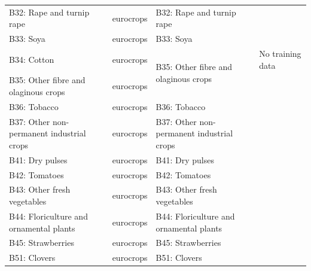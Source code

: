 \begin{table}[]
{\begin{tabular}{llll}
B32: Rape and turnip rape                     & eurocrops               & B32: Rape and turnip rape                             &                                                           \\
B33: Soya                                     & eurocrops               & B33: Soya                                             &                                                           \\
B34: Cotton                                   & eurocrops               & \multirow{2}{*}{B35: Other fibre and olaginous crops} & No training data\\
B35: Other fibre and olaginous crops          & eurocrops               &                                                       &                                                           \\
B36: Tobacco                                  & eurocrops               & B36: Tobacco                                          &                                                           \\
B37: Other non-permanent industrial crops     & eurocrops               & B37: Other non-permanent industrial crops             &                                                           \\
B41: Dry pulses                               & eurocrops               & B41: Dry pulses                                       &                                                           \\
B42: Tomatoes                                 & eurocrops               & B42: Tomatoes                                         &                                                           \\
B43: Other fresh vegetables                   & eurocrops               & B43: Other fresh vegetables                           &                                                           \\
B44: Floriculture and ornamental plants       & eurocrops               & B44: Floriculture and ornamental plants               &                                                           \\
B45: Strawberries                             & eurocrops               & B45: Strawberries                                     &                                                           \\
B51: Clovers                                  & eurocrops               & B51: Clovers                                          &                                                           \\

\end{tabular}}
\end{table}
